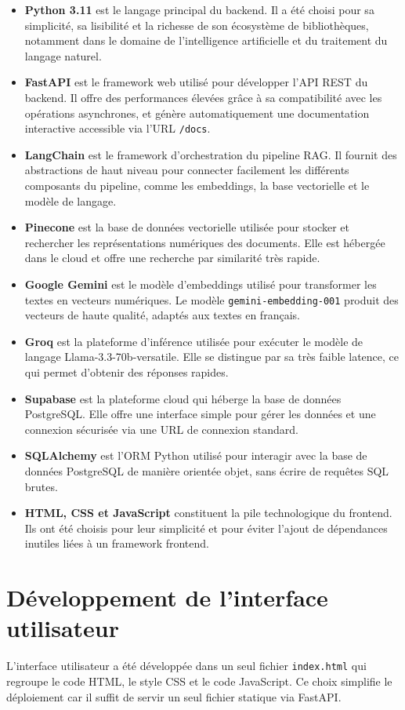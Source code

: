 \documentclass[12pt, a4paper, twoside]{report}
\begin{document}
\begin{itemize}[label=\bullet]
    \item \textbf{Python 3.11} est le langage principal du backend. Il a été choisi pour sa simplicité, sa lisibilité et la richesse de son écosystème de bibliothèques, notamment dans le domaine de l'intelligence artificielle et du traitement du langage naturel.
    \item \textbf{FastAPI} est le framework web utilisé pour développer l'API REST du backend. Il offre des performances élevées grâce à sa compatibilité avec les opérations asynchrones, et génère automatiquement une documentation interactive accessible via l'URL \texttt{/docs}.
    \item \textbf{LangChain} est le framework d'orchestration du pipeline RAG. Il fournit des abstractions de haut niveau pour connecter facilement les différents composants du pipeline, comme les embeddings, la base vectorielle et le modèle de langage.
    \item \textbf{Pinecone} est la base de données vectorielle utilisée pour stocker et rechercher les représentations numériques des documents. Elle est hébergée dans le cloud et offre une recherche par similarité très rapide.
    \item \textbf{Google Gemini} est le modèle d'embeddings utilisé pour transformer les textes en vecteurs numériques. Le modèle \texttt{gemini-embedding-001} produit des vecteurs de haute qualité, adaptés aux textes en français.
    \item \textbf{Groq} est la plateforme d'inférence utilisée pour exécuter le modèle de langage Llama-3.3-70b-versatile. Elle se distingue par sa très faible latence, ce qui permet d'obtenir des réponses rapides.
    \item \textbf{Supabase} est la plateforme cloud qui héberge la base de données PostgreSQL. Elle offre une interface simple pour gérer les données et une connexion sécurisée via une URL de connexion standard.
    \item \textbf{SQLAlchemy} est l'ORM Python utilisé pour interagir avec la base de données PostgreSQL de manière orientée objet, sans écrire de requêtes SQL brutes.
    \item \textbf{HTML, CSS et JavaScript} constituent la pile technologique du frontend. Ils ont été choisis pour leur simplicité et pour éviter l'ajout de dépendances inutiles liées à un framework frontend.
\end{itemize}

\section{Développement de l'interface utilisateur}
L'interface utilisateur a été développée dans un seul fichier \texttt{index.html} qui regroupe le code HTML, le style CSS et le code JavaScript. Ce choix simplifie le déploiement car il suffit de servir un seul fichier statique via FastAPI.
\end{document}
